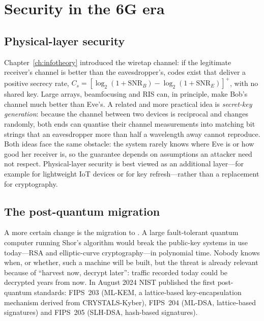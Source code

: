 \section{Security in the 6G era}
\label{sec:ch25:security}


\subsection{Physical-layer security}

Chapter~\ref{ch:infotheory} introduced the wiretap channel: if the legitimate receiver's channel is
better than the eavesdropper's, codes exist that deliver a positive secrecy rate,
$C_s=[\log_2(1+\mathrm{SNR}_B)-\log_2(1+\mathrm{SNR}_E)]^+$, with no shared key. Large arrays, beamfocusing
and RIS can, in principle, make Bob's channel much better than Eve's. A related and more practical
idea is \emph{secret-key generation}: because the channel between two devices is reciprocal and
changes randomly, both ends can quantise their channel measurements into matching bit strings that an
eavesdropper more than half a wavelength away cannot reproduce. Both ideas face the same obstacle:
the system rarely knows where Eve is or how good her receiver is, so the guarantee depends on
assumptions an attacker need not respect. Physical-layer security is best viewed as an additional
layer---for example for lightweight IoT devices or for key refresh---rather than a replacement for
cryptography.

\subsection{The post-quantum migration}

A more certain change is the migration to . A large fault-tolerant
quantum computer running Shor's algorithm would break the public-key systems in use today---RSA and
elliptic-curve cryptography---in polynomial time. Nobody knows when, or whether, such a machine will be
built, but the threat is already relevant because of ``harvest now, decrypt later'': traffic recorded
today could be decrypted years from now. In August 2024 NIST published the first post-quantum standards:
FIPS~203 (ML-KEM, a lattice-based key-encapsulation mechanism derived from CRYSTALS-Kyber),
FIPS~204 (ML-DSA, lattice-based signatures) and FIPS~205 (SLH-DSA, hash-based signatures).

